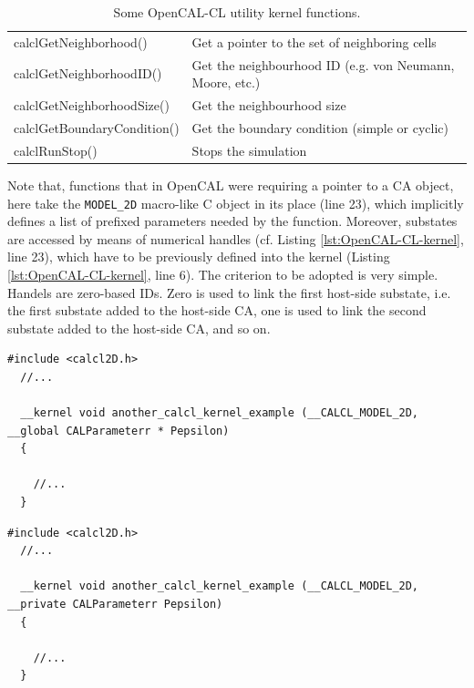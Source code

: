 \begin{table}
\begin{footnotesize}
\begin{tabular}{l|l}
    calclGetNeighborhood()         & Get a pointer to the set of neighboring cells \\
    calclGetNeighborhoodID()       & Get the neighbourhood ID (e.g. von Neumann, Moore, etc.) \\
    calclGetNeighborhoodSize()     & Get the neighbourhood size \\
    calclGetBoundaryCondition()    & Get the boundary condition (simple or cyclic) \\
    calclRunStop()                 & Stops the simulation \\
    \hline
    \end{tabular}
    \end{footnotesize}
  \caption{Some OpenCAL-CL utility kernel functions.}
  \label{tab:kernel-utility-function}
\end{table} 

Note that, functions that in OpenCAL were requiring a pointer to a CA
object, here take the \verb'MODEL_2D' macro-like C object in its place
(line 23), which implicitly defines a list of prefixed parameters
needed by the function. Moreover, substates are accessed by means of
numerical handles (cf. Listing \ref{lst:OpenCAL-CL-kernel}, line 23),
which have to be previously defined into the kernel (Listing
\ref{lst:OpenCAL-CL-kernel}, line 6). The criterion to be adopted is
very simple. Handels are zero-based IDs. Zero is used to link the
first host-side substate, i.e. the first substate added to the
host-side CA, one is used to link the second substate added to the
host-side CA, and so on.

\begin{lstlisting}[float,floatplacement=H, label=lst:Another-OpenCAL-CL-kernel, caption={Another example of OpenCAL-CL kernel, with an additional global parameter.}] 
  #include <calcl2D.h>
  //...
    
  __kernel void another_calcl_kernel_example (__CALCL_MODEL_2D, __global CALParameterr * Pepsilon)
  {
    
    //...
  }
\end{lstlisting}

\begin{lstlisting}[float,floatplacement=H, label=lst:kernel-private-parameter, caption={Another example of OpenCAL-CL kernel, with an additional private parameter.}] 
  #include <calcl2D.h>
  //...
    
  __kernel void another_calcl_kernel_example (__CALCL_MODEL_2D, __private CALParameterr Pepsilon)
  {
    
    //...
  }
\end{lstlisting}



